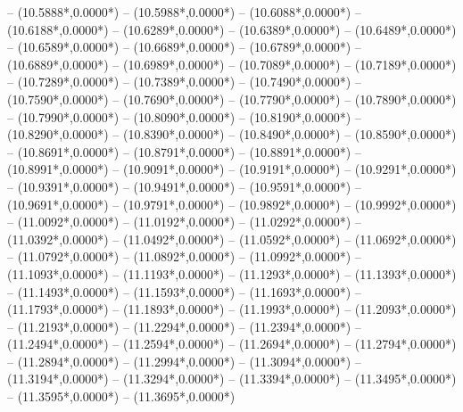 {	-- ({10.5888*\dx},{0.0000*\dy})
	-- ({10.5988*\dx},{0.0000*\dy})
	-- ({10.6088*\dx},{0.0000*\dy})
	-- ({10.6188*\dx},{0.0000*\dy})
	-- ({10.6289*\dx},{0.0000*\dy})
	-- ({10.6389*\dx},{0.0000*\dy})
	-- ({10.6489*\dx},{0.0000*\dy})
	-- ({10.6589*\dx},{0.0000*\dy})
	-- ({10.6689*\dx},{0.0000*\dy})
	-- ({10.6789*\dx},{0.0000*\dy})
	-- ({10.6889*\dx},{0.0000*\dy})
	-- ({10.6989*\dx},{0.0000*\dy})
	-- ({10.7089*\dx},{0.0000*\dy})
	-- ({10.7189*\dx},{0.0000*\dy})
	-- ({10.7289*\dx},{0.0000*\dy})
	-- ({10.7389*\dx},{0.0000*\dy})
	-- ({10.7490*\dx},{0.0000*\dy})
	-- ({10.7590*\dx},{0.0000*\dy})
	-- ({10.7690*\dx},{0.0000*\dy})
	-- ({10.7790*\dx},{0.0000*\dy})
	-- ({10.7890*\dx},{0.0000*\dy})
	-- ({10.7990*\dx},{0.0000*\dy})
	-- ({10.8090*\dx},{0.0000*\dy})
	-- ({10.8190*\dx},{0.0000*\dy})
	-- ({10.8290*\dx},{0.0000*\dy})
	-- ({10.8390*\dx},{0.0000*\dy})
	-- ({10.8490*\dx},{0.0000*\dy})
	-- ({10.8590*\dx},{0.0000*\dy})
	-- ({10.8691*\dx},{0.0000*\dy})
	-- ({10.8791*\dx},{0.0000*\dy})
	-- ({10.8891*\dx},{0.0000*\dy})
	-- ({10.8991*\dx},{0.0000*\dy})
	-- ({10.9091*\dx},{0.0000*\dy})
	-- ({10.9191*\dx},{0.0000*\dy})
	-- ({10.9291*\dx},{0.0000*\dy})
	-- ({10.9391*\dx},{0.0000*\dy})
	-- ({10.9491*\dx},{0.0000*\dy})
	-- ({10.9591*\dx},{0.0000*\dy})
	-- ({10.9691*\dx},{0.0000*\dy})
	-- ({10.9791*\dx},{0.0000*\dy})
	-- ({10.9892*\dx},{0.0000*\dy})
	-- ({10.9992*\dx},{0.0000*\dy})
	-- ({11.0092*\dx},{0.0000*\dy})
	-- ({11.0192*\dx},{0.0000*\dy})
	-- ({11.0292*\dx},{0.0000*\dy})
	-- ({11.0392*\dx},{0.0000*\dy})
	-- ({11.0492*\dx},{0.0000*\dy})
	-- ({11.0592*\dx},{0.0000*\dy})
	-- ({11.0692*\dx},{0.0000*\dy})
	-- ({11.0792*\dx},{0.0000*\dy})
	-- ({11.0892*\dx},{0.0000*\dy})
	-- ({11.0992*\dx},{0.0000*\dy})
	-- ({11.1093*\dx},{0.0000*\dy})
	-- ({11.1193*\dx},{0.0000*\dy})
	-- ({11.1293*\dx},{0.0000*\dy})
	-- ({11.1393*\dx},{0.0000*\dy})
	-- ({11.1493*\dx},{0.0000*\dy})
	-- ({11.1593*\dx},{0.0000*\dy})
	-- ({11.1693*\dx},{0.0000*\dy})
	-- ({11.1793*\dx},{0.0000*\dy})
	-- ({11.1893*\dx},{0.0000*\dy})
	-- ({11.1993*\dx},{0.0000*\dy})
	-- ({11.2093*\dx},{0.0000*\dy})
	-- ({11.2193*\dx},{0.0000*\dy})
	-- ({11.2294*\dx},{0.0000*\dy})
	-- ({11.2394*\dx},{0.0000*\dy})
	-- ({11.2494*\dx},{0.0000*\dy})
	-- ({11.2594*\dx},{0.0000*\dy})
	-- ({11.2694*\dx},{0.0000*\dy})
	-- ({11.2794*\dx},{0.0000*\dy})
	-- ({11.2894*\dx},{0.0000*\dy})
	-- ({11.2994*\dx},{0.0000*\dy})
	-- ({11.3094*\dx},{0.0000*\dy})
	-- ({11.3194*\dx},{0.0000*\dy})
	-- ({11.3294*\dx},{0.0000*\dy})
	-- ({11.3394*\dx},{0.0000*\dy})
	-- ({11.3495*\dx},{0.0000*\dy})
	-- ({11.3595*\dx},{0.0000*\dy})
	-- ({11.3695*\dx},{0.0000*\dy})
}
